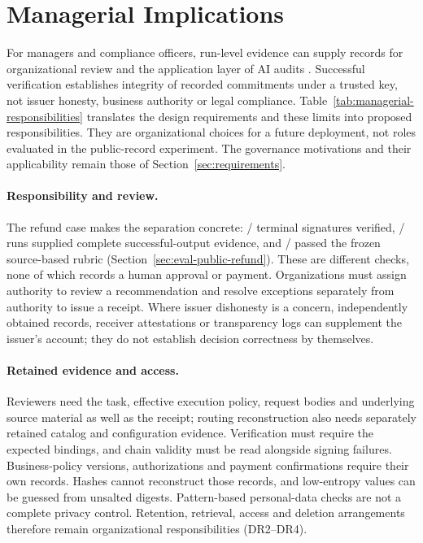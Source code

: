 \documentclass[11pt]{article}
\begin{document}
\clearpage
\section{Managerial Implications}\label{sec:managerial-implications}

For managers and compliance officers, run-level evidence can supply records for organizational review and the application layer of AI audits \citep{mokander2023}. Successful verification establishes integrity of recorded commitments under a trusted key, not issuer honesty, business authority or legal compliance. Table~\ref{tab:managerial-responsibilities} translates the design requirements and these limits into proposed responsibilities. They are organizational choices for a future deployment, not roles evaluated in the public-record experiment. The governance motivations and their applicability remain those of Section~\ref{sec:requirements}.

\paragraph{Responsibility and review.} The refund case makes the separation concrete: \CfourPublicSignatures{}/\CfourPublicPlanned{} terminal signatures verified, \CfourPublicPackages{}/\CfourPublicPlanned{} runs supplied complete successful-output evidence, and \CfourPublicFrozen{}/\CfourPublicPlanned{} passed the frozen source-based rubric (Section~\ref{sec:eval-public-refund}). These are different checks, none of which records a human approval or payment. Organizations must assign authority to review a recommendation and resolve exceptions separately from authority to issue a receipt. Where issuer dishonesty is a concern, independently obtained records, receiver attestations or transparency logs can supplement the issuer's account; they do not establish decision correctness by themselves.



\paragraph{Retained evidence and access.} Reviewers need the task, effective execution policy, request bodies and underlying source material as well as the receipt; routing reconstruction also needs separately retained catalog and configuration evidence. Verification must require the expected bindings, and chain validity must be read alongside signing failures. Business-policy versions, authorizations and payment confirmations require their own records. Hashes cannot reconstruct those records, and low-entropy values can be guessed from unsalted digests. Pattern-based personal-data checks are not a complete privacy control. Retention, retrieval, access and deletion arrangements therefore remain organizational responsibilities (DR2--DR4).
\end{document}
